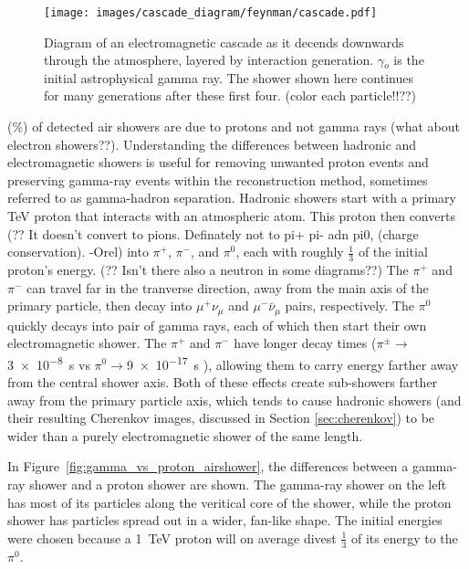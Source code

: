   \begin{figure}[ht]
    \centering
    \texttt{[image: images/cascade\_diagram/feynman/cascade.pdf]}
    \caption[Electromagnetic Cascade]{
      Diagram of an electromagnetic cascade as it decends downwards through the atmosphere, layered by interaction generation.
      $\gamma{}_o$ is the initial astrophysical gamma ray.
      The shower shown here continues for many generations after these first four.
      {\color{red}(color each particle!!??)}
    }
    \label{fig:emcascade}
  \end{figure}

  (\%) of detected air showers are due to {\color{red}protons and not gamma rays (what about electron showers??)}.
  Understanding the differences between hadronic and electromagnetic showers is useful for removing unwanted proton events and preserving gamma-ray events within the reconstruction method, sometimes referred to as gamma-hadron separation.
  Hadronic showers start with a primary \nicetilde TeV proton that interacts with an atmospheric atom.
  {\color{red}This proton then converts (?? It doesn't convert to pions. Definately not to pi+ pi- adn pi0, (charge conservation). -Orel)} into $\pi^{+}$, $\pi^{-}$, and $\pi^{0}$, each with roughly \nicetilde $\frac{1}{3}$ of the initial proton's energy.
  {\color{red}(?? Isn't there also a neutron in some diagrams??)}
  The $\pi^{+}$ and $\pi^{-}$ can travel far in the tranverse direction, away from the main axis of the primary particle, then decay into $\mu^{+}\nu_{\mu}$ and $\mu^{-}\bar{\nu}_{\mu}$ pairs, respectively.
  The $\pi^{0}$ quickly decays into pair of gamma rays, each of which then start their own electromagnetic shower.
  The $\pi^{+}$ and $\pi^{-}$ have longer decay times ($\pi^{\pm} \rightarrow $\SI{3e-8}{s} vs $\pi^{0} \rightarrow $\SI{9e-17}{s} \cite{pdg_2014} ), allowing them to carry energy farther away from the central shower axis.
  Both of these effects create sub-showers farther away from the primary particle axis, which tends to cause hadronic showers (and their resulting Cherenkov images, discussed in Section \ref{sec:cherenkov}) to be wider than a purely electromagnetic shower of the same length. 
  
  In Figure~\ref{fig:gamma_vs_proton_airshower}, the differences between a gamma-ray shower and a proton shower are shown.
  The gamma-ray shower on the left has most of its particles along the veritical core of the shower, while the proton shower has particles spread out in a wider, fan-like shape.
  The initial energies were chosen because a \SI{1}{TeV} proton will on average divest $\frac{1}{3}$ of its energy to the $\pi^{0}$.

